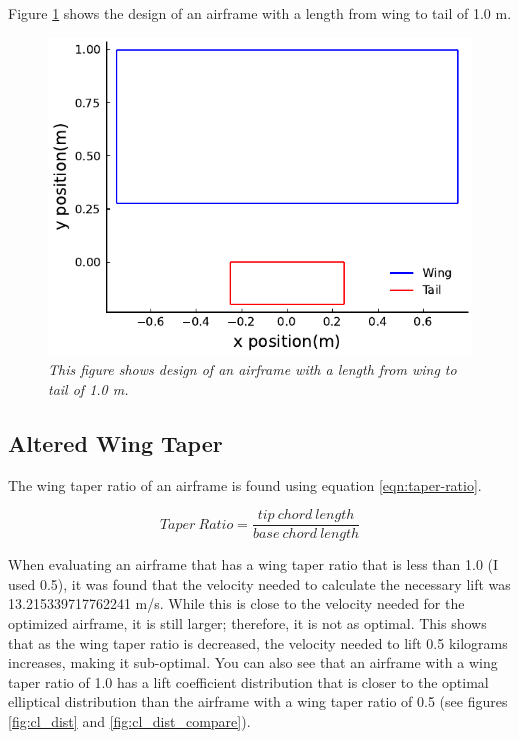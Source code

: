 \documentclass{journal}
\begin{document}
	Figure \ref{fig:length_design} shows the design of an airframe with a length from wing to tail of 1.0 m.
	
	\begin{figure}[H]
		\includegraphics{../graphics/length_design.pdf}
		\caption{\emph{This figure shows design of an airframe with a length from wing to tail of 1.0 m.}}
		\label{fig:length_design}
	\end{figure}

	\subsection{Altered Wing Taper}
	The wing taper ratio of an airframe is found using equation \ref{eqn:taper-ratio}.
	
	\begin{equation}
		Taper\ Ratio = \frac{tip\ chord\ length}{base\ chord\ length}
		\label{eqn:taper-ratio}
	\end{equation}
	
	When evaluating an airframe that has a wing taper ratio that is less than 1.0 (I used 0.5), it was found that the velocity needed to calculate the necessary lift was 13.215339717762241 m/s. While this is close to the velocity needed for the optimized airframe, it is still larger; therefore, it is not as optimal. This shows that as the wing taper ratio is decreased, the velocity needed to lift 0.5 kilograms increases, making it sub-optimal. You can also see that an airframe with a wing taper ratio of 1.0 has a lift coefficient distribution that is closer to the optimal elliptical distribution than the airframe with a wing taper ratio of 0.5 (see figures \ref{fig:cl_dist} and \ref{fig:cl_dist_compare}).\\
	
\end{document}
